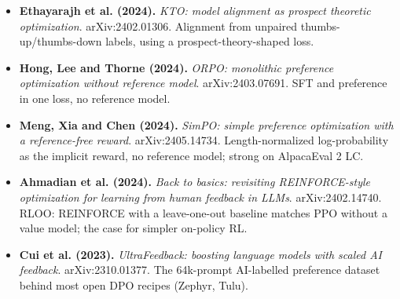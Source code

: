 \documentclass[11pt,letterpaper]{article}
\begin{document}
\begin{itemize}[leftmargin=1.2em,itemsep=3pt]
\item \textbf{Ethayarajh et al. (2024).} \textit{KTO: model alignment as prospect theoretic optimization}. arXiv:2402.01306. Alignment from unpaired thumbs-up/thumbs-down labels, using a prospect-theory-shaped loss.
\item \textbf{Hong, Lee and Thorne (2024).} \textit{ORPO: monolithic preference optimization without reference model}. arXiv:2403.07691. SFT and preference in one loss, no reference model.
\item \textbf{Meng, Xia and Chen (2024).} \textit{SimPO: simple preference optimization with a reference-free reward}. arXiv:2405.14734. Length-normalized log-probability as the implicit reward, no reference model; strong on AlpacaEval 2 LC.
\item \textbf{Ahmadian et al. (2024).} \textit{Back to basics: revisiting REINFORCE-style optimization for learning from human feedback in LLMs}. arXiv:2402.14740. RLOO: REINFORCE with a leave-one-out baseline matches PPO without a value model; the case for simpler on-policy RL.
\item \textbf{Cui et al. (2023).} \textit{UltraFeedback: boosting language models with scaled AI feedback}. arXiv:2310.01377. The 64k-prompt AI-labelled preference dataset behind most open DPO recipes (Zephyr, Tulu).
\end{itemize}
\end{document}
